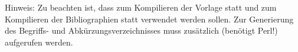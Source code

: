 \begin{tcolorbox}[colback=orange]
\footnotesize
Hinweis:
Zu beachten ist, dass zum Kompilieren der Vorlage
 statt 
und zum Kompilieren der Bibliographien
 statt 
verwendet werden sollen.
Zur Generierung des Begriffs- und Abkürzungsverzeichnisses muss zusätzlich
 (benötigt Perl!) aufgerufen werden.
\end{tcolorbox}
